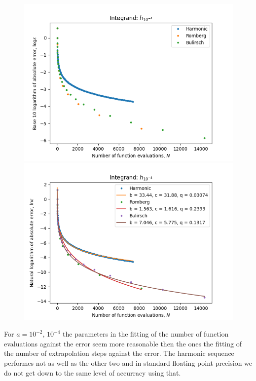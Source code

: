 \begin{figure}[H]
\centering
\begin{minipage}{0.45\textwidth}
\centering
\includegraphics[scale=0.45]{romberg_plots/h_tenthousandth_hp.png}
\end{minipage}
\begin{minipage}{0.45\textwidth}
\centering
\includegraphics[scale=0.45]{romberg_plots/h_tenthousandth_hp_trend.png}
\end{minipage}
\end{figure}

For \(a = 10^{-2},\, 10^{-4}\) the parameters in the fitting of the number of function evaluations against the error seem more reasonable then the ones the fitting of the number of extrapolation steps against the error. The harmonic sequence performes not as well as the other two and in standard floating point precision we do not get down to the same level of accurracy using that.\\

